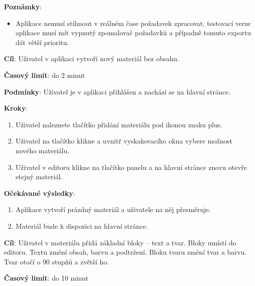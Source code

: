 \textbf{Poznámky}:

\begin{itemize}[leftmargin=1.4cm]
    \item Aplikace nemusí stihnout v reálném čase požadavek zpracovat, testovací verze aplikace musí mít vypnutý zpomalovač požadavků a případně tomuto exportu dát větší prioritu.
\end{itemize}






\vspace{1em}

\textbf{Cíl}: Uživatel v aplikaci vytvoří nový materiál bez obsahu.

\textbf{Časový limit}: do 2 minut

\textbf{Podmínky}: Uživatel je v aplikaci přihlášen a nachází se na hlavní stránce.

\textbf{Kroky}:

\begin{enumerate}[leftmargin=1.4cm]
    \item Uživatel naleznete tlačítko přidání materiálu pod ikonou znaku plus.
    \item Uživatel na tlačítko klikne a uvnitř vyskakovacího okna vybere možnost nového materiálu.
    \item Uživatel v editoru klikne na tlačítko panelu a na hlavní stránce znovu otevře stejný materiál.
\end{enumerate}

\textbf{Očekávané výsledky}:

\begin{enumerate}[leftmargin=1.4cm]
    \item Aplikace vytvoří prázdný materiál a uživatele na něj přesměruje.
    \item Materiál bude k dispozici na hlavní stránce.
\end{enumerate}






\vspace{1em}

\textbf{Cíl}: Uživatel v materiálu přidá základní bloky -- text a tvar. Bloky umístí do editoru. Textu změní obsah, barvu a podtržení. Bloku tvaru změní tvar a barvu. Tvar otočí o 90 stupňů a zvětší ho. 

\textbf{Časový limit}: do 10 minut

